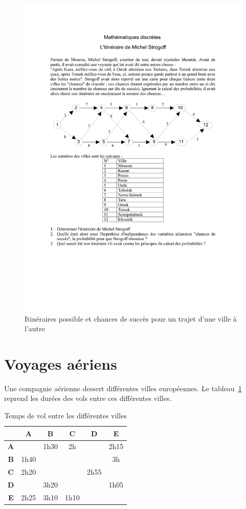 \documentclass[paper=a4, fontsize=11pt]{scrartcl} %
\numberwithin{equation}{section} %
\numberwithin{figure}{section} %
\numberwithin{table}{section} %
\begin{document}
\begin{figure}[htbp]
\begin{center}
	\includegraphics[width=.8\textwidth]{strogoff.pdf}
	\caption{Itinéraires possible et chances de succès pour un trajet d'une ville à l'autre}
	\label{fig:ms}
\end{center}
\end{figure}

\section{Voyages aériens}

Une compagnie aérienne dessert différentes villes européennes. Le tableau~\ref{gr:airtravel} reprend les durées des vols entre ces différentes villes. 

\begin{table}[htbp]
\begin{center}

\begin{tabular}{|c|c|c|c|c|c|}
\hline 
 & \textbf{A}  & \textbf{B} & \textbf{C} & \textbf{D} & \textbf{E} \\ 
\hline 
\textbf{A} &  & 1h30  & 2h &  & 2h15 \\ 
\hline 
\textbf{B} & 1h40 &  &  &  & 3h \\ 
\hline 
\textbf{C} & 2h20 &  &  & 2h55 &  \\ 
\hline 
\textbf{D} &  & 3h20 &  &  & 1h05 \\ 
\hline 
\textbf{E} & 2h25 & 3h10 & 1h10 &  &  \\ 
\hline 
\end{tabular} 
\caption{Temps de vol entre les différentes villes}
\label{gr:airtravel}
\end{center}
\end{table}
\end{document}
